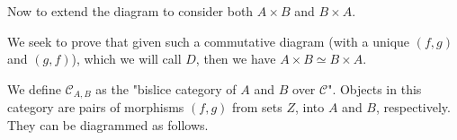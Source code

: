 \documentclass[12pt, letterpaper, twoside]{report}
\begin{document}

Now to extend the diagram to consider both $A \times B$ and $B \times A$.


We seek to prove that given such a commutative diagram (with a unique $(f,g)$ and $(g,f)$), which we will call $D$, then we have $A \times B \simeq B \times A$.

We define $\mathcal{C}_{A,B}$ as the "bislice category of $A$ and $B$ over $\mathcal{C}$". Objects in this category are pairs of morphisms $(f,g)$ from sets $Z$, into $A$ and $B$, respectively. They can be diagrammed as follows.
\end{document}
